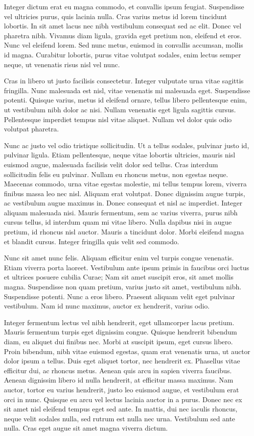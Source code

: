 \documentclass{article}
\begin{document}
	Integer dictum erat eu magna commodo, et convallis ipsum feugiat. Suspendisse vel ultricies purus, quis lacinia nulla. Cras varius metus id lorem tincidunt lobortis. In sit amet lacus nec nibh vestibulum consequat sed ac elit. Donec vel pharetra nibh. Vivamus diam ligula, gravida eget pretium non, eleifend et eros. Nunc vel eleifend lorem. Sed nunc metus, euismod in convallis accumsan, mollis id magna. Curabitur lobortis, purus vitae volutpat sodales, enim lectus semper neque, ut venenatis risus nisl vel nunc.
	
	Cras in libero ut justo facilisis consectetur. Integer vulputate urna vitae sagittis fringilla. Nunc malesuada est nisl, vitae venenatis mi malesuada eget. Suspendisse potenti. Quisque varius, metus id eleifend ornare, tellus libero pellentesque enim, ut vestibulum nibh dolor ac nisi. Nullam venenatis eget ligula sagittis cursus. Pellentesque imperdiet tempus nisl vitae aliquet. Nullam vel dolor quis odio volutpat pharetra.
	
	Nunc ac justo vel odio tristique sollicitudin. Ut a tellus sodales, pulvinar justo id, pulvinar ligula. Etiam pellentesque, neque vitae lobortis ultricies, mauris nisl euismod augue, malesuada facilisis velit dolor sed tellus. Cras interdum sollicitudin felis eu pulvinar. Nullam eu rhoncus metus, non egestas neque. Maecenas commodo, urna vitae egestas molestie, mi tellus tempus lorem, viverra finibus massa leo nec nisl. Aliquam erat volutpat. Donec dignissim augue turpis, ac vestibulum augue maximus in. Donec consequat et nisl ac imperdiet. Integer aliquam malesuada nisi. Mauris fermentum, sem ac varius viverra, purus nibh cursus tellus, id interdum quam mi vitae libero. Nulla dapibus nisi in augue pretium, id rhoncus nisl auctor. Mauris a tincidunt dolor. Morbi eleifend magna et blandit cursus. Integer fringilla quis velit sed commodo.
	
	Nunc sit amet nunc felis. Aliquam efficitur enim vel turpis congue venenatis. Etiam viverra porta laoreet. Vestibulum ante ipsum primis in faucibus orci luctus et ultrices posuere cubilia Curae; Nam sit amet suscipit eros, sit amet mollis magna. Suspendisse non quam pretium, varius justo sit amet, vestibulum nibh. Suspendisse potenti. Nunc a eros libero. Praesent aliquam velit eget pulvinar vestibulum. Nam id nunc maximus, auctor ex hendrerit, varius odio.
	
	Integer fermentum lectus vel nibh hendrerit, eget ullamcorper lacus pretium. Mauris fermentum turpis eget dignissim congue. Quisque hendrerit bibendum diam, eu aliquet dui finibus nec. Morbi at suscipit ipsum, eget cursus libero. Proin bibendum, nibh vitae euismod egestas, quam erat venenatis urna, ut auctor dolor ipsum a tellus. Duis eget aliquet tortor, nec hendrerit ex. Phasellus vitae efficitur dui, ac rhoncus metus. Aenean quis arcu in sapien viverra faucibus. Aenean dignissim libero id nulla hendrerit, at efficitur massa maximus. Nam auctor, tortor eu varius hendrerit, justo leo euismod augue, et vestibulum erat orci in nunc. Quisque eu arcu vel lectus lacinia auctor in a purus. Donec nec ex sit amet nisl eleifend tempus eget sed ante. In mattis, dui nec iaculis rhoncus, neque velit sodales nulla, sed rutrum est nulla nec urna. Vestibulum sed ante nulla. Cras eget augue sit amet magna viverra dictum.
	
\end{document}
